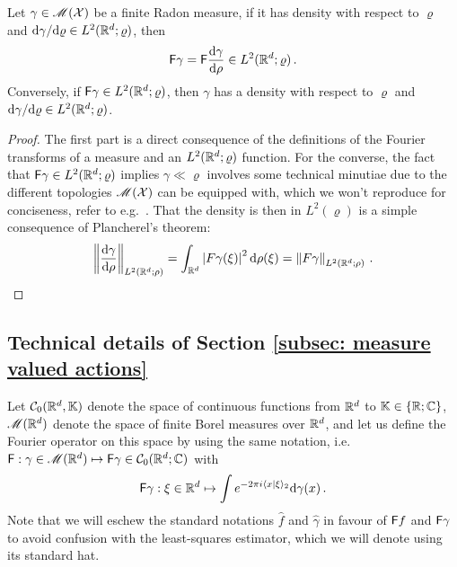 \begin{lemma}\label{lemma: fundamental facts about fourier transform of measure}
    Let $\gamma\in\mathscr{M}(\mathcal{X})$ be a finite Radon measure, if it has density with respect to $\varrho$ and $\mathrm{d}\gamma/\mathrm{d}\varrho\in L^2(\mathbb{R}^d;\varrho)$, then 
    \[
        \mathsf{F}\gamma = \mathsf{F} \frac{\mathrm{d}\gamma}{\mathrm{d}\rho}\in L^2(\mathbb{R}^d;\varrho)\,.
    \]
    Conversely, if $\mathsf{F}\gamma\in L^2(\mathbb{R}^d;\varrho)$, then $\gamma$ has a density with respect to $\varrho$ and $\mathrm{d}\gamma
/\mathrm{d}\varrho\in L^2(\mathbb{R}^d;\varrho)$.
\end{lemma}
\begin{proof}
    The first part is a direct consequence of the definitions of the Fourier transforms of a measure and an $L^2(\mathbb{R}^d;\varrho)$ function. For the converse, the fact that $\mathsf{F}\gamma
\in L^2(\mathbb{R}^d;\varrho)$ implies $\gamma
 \ll \varrho$ involves some technical minutiae due to the different topologies $\mathscr{M}(\mathcal{X})$ can be equipped with, which we won't reproduce for conciseness, refer to e.g.\ \cite[Lemma~1.1]{fournier_absolute_2010}. That the density is then in $L^2(\varrho)$ is a simple consequence of Plancherel's theorem:
    \[
        \norm{\frac{\de\gamma}{\de\rho}}_{L^2(\Rb^d;\rho)} =\int_{\Rb^d}\abs{F\gamma(\xi)}^2\de\rho(\xi) = \norm{F\gamma}_{L^2(\Rb^d;\rho)}\,.%
    \]
\end{proof}



\subsection{Technical details of Section {\ref{subsec: measure valued actions}}}



Let $\mathcal{C}_0(\mathbb{R}^d,\mathbb{K})$ denote the space of continuous functions from $\mathbb{R}^d$ to $\mathbb{K}\in\{\mathbb{R};\mathbb{C}\}$, $\mathscr{M}(\mathbb{R}^d)$ denote the space of finite Borel measures over $\mathbb{R}^d$, and let us define the Fourier operator on this space by using the same notation, i.e.\ $\mathsf{F}: \gamma\in\mathscr{M}(\mathbb{R}^d)\mapsto\mathsf{F}\gamma\in\mathcal{C}_0(\mathbb{R}^d;\mathbb{C})$ with
\begin{align}
    \mathsf{F}\gamma: \xi\in\mathbb{R}^d \mapsto \int e^{-2\pi i\langle x\vert \xi\rangle_2}\mathrm{d}\gamma(x)\,
    .\label{eq: fourier transform of measure}
\end{align}
Note that we will eschew the standard notations $\hat f$ and $\hat\gamma$ in favour of $\mathsf{F} f$ and $\mathsf{F}\gamma$ to avoid confusion with the least-squares estimator, which we will denote using its standard hat.


